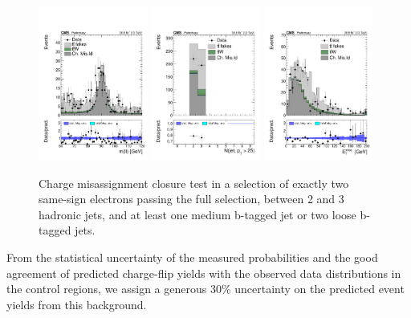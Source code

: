 \begin{figure}[htp]
	\centering
	\includegraphics[width=0.32\textwidth]{plots_leptons/chargeflip/closure_tt/minMllAFAS.pdf}
	\includegraphics[width=0.32\textwidth]{plots_leptons/chargeflip/closure_tt/nJet25.pdf}
	\includegraphics[width=0.32\textwidth]{plots_leptons/chargeflip/closure_tt/met.pdf}
	\caption{
	Charge misassignment closure test in a selection of exactly two same-sign electrons passing the full selection, between 2 and 3 hadronic jets, and at least one medium b-tagged jet or two loose b-tagged jets.
	}
	\label{fig:chmisid_closure_tt}
\end{figure}

From the statistical uncertainty of the measured probabilities and the good agreement of predicted charge-flip yields with the observed data distributions in the control regions, we assign a generous 30\% uncertainty on the predicted event yields from this background.

